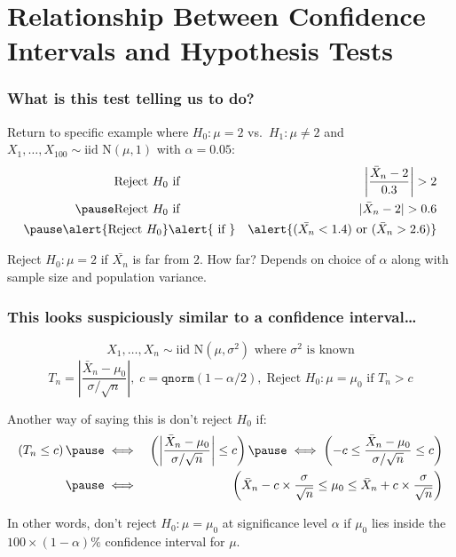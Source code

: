 \section{Relationship Between Confidence Intervals and Hypothesis Tests}
\begin{frame}
  \frametitle{What is this test telling us to do?}
  Return to specific example where $H_0\colon \mu = 2$ vs.\ $H_1\colon \mu \neq 2$ and $X_1, \dots, X_{100} \sim \mbox{iid N}(\mu, 1)$ with $\alpha = 0.05$:
  \begin{eqnarray*}
    \mbox{Reject } H_0 &\mbox{ if }& \left|\frac{\bar{X}_n - 2}{0.3}\right| > 2\\\pause
     \mbox{Reject } H_0 &\mbox{ if }&|\bar{X}_n - 2| > 0.6 \\ \pause
     \alert{\mbox{Reject } H_0} &\alert{\mbox{ if }}& \alert{(\bar{X_n} < 1.4) \mbox{ or } (\bar{X}_n > 2.6)} 
  \end{eqnarray*}

  Reject $H_0\colon \mu = 2$ if $\bar{X_n}$ is far from $2$. 
  How far?
  Depends on choice of $\alpha$ along with sample size and population variance.
\end{frame}
\begin{frame}
  \frametitle{This looks suspiciously similar to a confidence interval\dots}

  \small 
  \[
    \boxed{X_1, \dots, X_n \sim \mbox{iid N}(\mu, \sigma^2) \mbox{ where }\sigma^2 \mbox{ is known}}
  \]
  \[
    \boxed{T_n = \displaystyle\left|\frac{\bar{X}_n - \mu_0}{\sigma/\sqrt{n}}\right|, \; c = \texttt{qnorm}(1 - \alpha/2), \; \mbox{Reject } H_0\colon \mu = \mu_0 \mbox{ if } T_n > c}
  \]

  \vspace{1em}
  Another way of saying this is don't reject $H_0$ if:
  \begin{eqnarray*}
    \left(T_n \leq c\right) \pause &\iff&
    \left(\left|\frac{\bar{X}_n - \mu_0}{\sigma/\sqrt{n}}\right| \leq c \right) \pause
    \iff \left(-c \leq \frac{\bar{X}_n - \mu_0}{\sigma/\sqrt{n}}\leq c\right)\\ \pause
    &\iff& \left(\bar{X}_n - c \times \frac{\sigma}{\sqrt{n}} \leq \mu_0 \leq \bar{X}_n + c\times\frac{\sigma}{\sqrt{n}}  \right)
  \end{eqnarray*}

  \pause

  \alert{In other words, don't reject $H_0\colon \mu = \mu_0$ at significance level $\alpha$ if $\mu_0$ lies inside the $100 \times (1 - \alpha)\%$ confidence interval for $\mu$.}

\end{frame}
